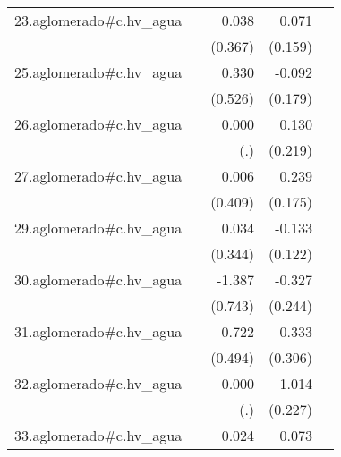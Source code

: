 {\begin{longtable}{l*{4}{D{.}{.}{-1}}}
\addlinespace
23.aglomerado#c.hv\_agua&                     &       0.038         &       0.071         &                     \\
            &                     &     (0.367)         &     (0.159)         &                     \\
\addlinespace
25.aglomerado#c.hv\_agua&                     &       0.330         &      -0.092         &                     \\
            &                     &     (0.526)         &     (0.179)         &                     \\
\addlinespace
26.aglomerado#c.hv\_agua&                     &       0.000         &       0.130         &                     \\
            &                     &         (.)         &     (0.219)         &                     \\
\addlinespace
27.aglomerado#c.hv\_agua&                     &       0.006         &       0.239         &                     \\
            &                     &     (0.409)         &     (0.175)         &                     \\
\addlinespace
29.aglomerado#c.hv\_agua&                     &       0.034         &      -0.133         &                     \\
            &                     &     (0.344)         &     (0.122)         &                     \\
\addlinespace
30.aglomerado#c.hv\_agua&                     &      -1.387         &      -0.327         &                     \\
            &                     &     (0.743)         &     (0.244)         &                     \\
\addlinespace
31.aglomerado#c.hv\_agua&                     &      -0.722         &       0.333         &                     \\
            &                     &     (0.494)         &     (0.306)         &                     \\
\addlinespace
32.aglomerado#c.hv\_agua&                     &       0.000         &       1.014\sym{***}&                     \\
            &                     &         (.)         &     (0.227)         &                     \\
\addlinespace
33.aglomerado#c.hv\_agua&                     &       0.024         &       0.073         &                     \\

\end{longtable}}
